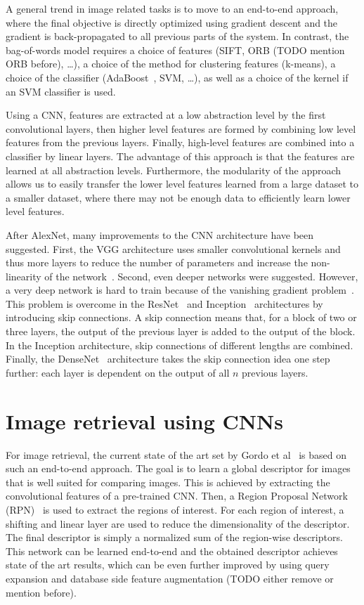 A general trend in image related tasks is to move to an end-to-end
approach, where the final objective is directly optimized using gradient
descent and the gradient is back-propagated to all previous parts of the
system. In contrast, the bag-of-words model requires a choice of
features (SIFT, ORB (TODO mention ORB before), \dots),
a choice of the method for clustering features (k-means),
a choice of the classifier (AdaBoost~\cite{}, SVM, \dots),
as well as a choice of the kernel if an SVM classifier is used.

Using a CNN, features are extracted at a low abstraction level by the
first convolutional layers, then higher level features are formed
by combining low level features from the previous layers. Finally,
high-level features are combined into a classifier by linear layers.
The advantage of this approach is that the features are learned at all
abstraction levels. Furthermore, the modularity of the approach allows
us to easily transfer the lower level features learned from a large dataset
to a smaller dataset, where there may not be enough data to efficiently
learn lower level features.

After AlexNet, many improvements to the CNN architecture have been
suggested. First, the VGG architecture uses smaller convolutional kernels
and thus more layers to reduce the number of parameters and increase
the non-linearity of the network~\cite{simonyan_very_2014}. Second,
even deeper networks were suggested. However, a very deep network
is hard to train because of the vanishing gradient problem~\cite{}.
This problem is overcome in the ResNet~\cite{he_deep_2015} and
Inception~\cite{szegedy_inception-v4_2016} architectures by introducing
skip connections. A skip connection means that, for a block of two or
three layers, the output of the previous layer is added to the output
of the block. In the Inception architecture, skip connections of different
lengths are combined. Finally, the DenseNet~\cite{} architecture takes
the skip connection idea one step further: each layer is dependent on
the output of all $n$ previous layers.

\section{Image retrieval using CNNs}
For image retrieval, the current state of the art set by
Gordo et al~\cite{gordo_deep_2016} is based on such an
end-to-end approach. The goal is to learn a global descriptor for images
that is well suited for comparing images.
This is achieved by extracting the convolutional features of a pre-trained
CNN. Then, a Region Proposal Network (RPN)~\cite{TODO faster rcnn} is
used to extract the regions of interest. For each region of interest,
a shifting and linear layer are used to reduce the dimensionality of
the descriptor. The final descriptor is simply a normalized sum of the
region-wise descriptors. This network can be learned end-to-end and
the obtained descriptor achieves state of the art results, which can
be even further improved by using query expansion and database side
feature augmentation (TODO either remove or mention before).

